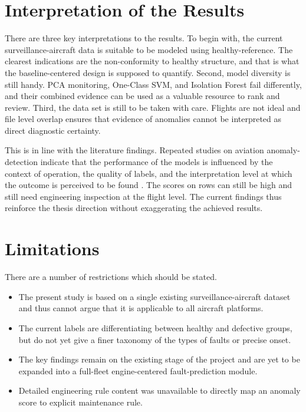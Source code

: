 \documentclass[12pt,a4paper]{report}
\begin{document}
	\section{Interpretation of the Results}
	
	There are three key interpretations to the results. To begin with, the current surveillance-aircraft data is suitable to be modeled using healthy-reference. The clearest indications are the non-conformity to healthy structure, and that is what the baseline-centered design is supposed to quantify. Second, model diversity is still handy. PCA monitoring, One-Class SVM, and Isolation Forest fail differently, and their combined evidence can be used as a valuable resource to rank and review. Third, the data set is still to be taken with care. Flights are not ideal and file level overlap ensures that evidence of anomalies cannot be interpreted as direct diagnostic certainty.
	
	This is in line with the literature findings. Repeated studies on aviation anomaly-detection indicate that the performance of the models is influenced by the context of operation, the quality of labels, and the interpretation level at which the outcome is perceived to be found \cite{basora2019aviation,jasra2022hybrid,memarzadeh2022resad}. The scores on rows can still be high and still need engineering inspection at the flight level. The current findings thus reinforce the thesis direction without exaggerating the achieved results.
	
	\section{Limitations}
	
	There are a number of restrictions which should be stated.
	
	\begin{itemize}
		\item The present study is based on a single existing surveillance-aircraft dataset and thus cannot argue that it is applicable to all aircraft platforms.
		\item The current labels are differentiating between healthy and defective groups, but do not yet give a finer taxonomy of the types of faults or precise onset.
		\item The key findings remain on the existing stage of the project and are yet to be expanded into a full-fleet engine-centered fault-prediction module.
		\item Detailed engineering rule content was unavailable to directly map an anomaly score to explicit maintenance rule.
	\end{itemize}
	
\end{document}
